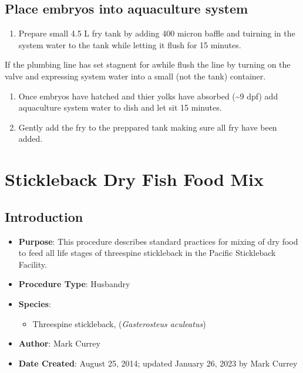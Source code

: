 \documentclass[
  letterpaper,
  DIV=11,
  numbers=noendperiod]{scrreprt}
\providecommand{\tightlist}{%
  \setlength{\itemsep}{0pt}\setlength{\parskip}{0pt}}\usepackage{longtable,booktabs,array}
\begin{document}
\hypertarget{place-embryos-into-aquaculture-system}{%
\section{Place embryos into aquaculture
system}\label{place-embryos-into-aquaculture-system}}

\begin{enumerate}
\def\labelenumi{\arabic{enumi}.}
\setcounter{enumi}{28}
\tightlist
\item
  Prepare small 4.5 L fry tank by adding 400 micron baffle and tuirning
  in the system water to the tank while letting it flush for 15 minutes.
\end{enumerate}

If the plumbing line has set stagnent for awhile flush the line by
turning on the valve and expressing system water into a small (not the
tank) container.

\begin{enumerate}
\def\labelenumi{\arabic{enumi}.}
\setcounter{enumi}{29}
\tightlist
\item
  Once embryos have hatched and thier yolks have absorbed
  (\textasciitilde9 dpf) add aquaculture system water to dish and let
  sit 15 minutes.
\item
  Gently add the fry to the preppared tank making sure all fry have been
  added.
\end{enumerate}

\hypertarget{sec-husbandry-dry_fish_food}{%
\chapter{Stickleback Dry Fish Food
Mix}\label{sec-husbandry-dry_fish_food}}

\hypertarget{introduction-51}{%
\section{Introduction}\label{introduction-51}}

\begin{itemize}
\tightlist
\item
  \textbf{Purpose}: This procedure describes standard practices for
  mixing of dry food to feed all life stages of threespine stickleback
  in the Pacific Stickleback Facility.
\item
  \textbf{Procedure Type}: Husbandry
\item
  \textbf{Species}:

  \begin{itemize}
  \tightlist
  \item
    Threespine stickleback, (\emph{Gasterosteus aculeatus})
  \end{itemize}
\item
  \textbf{Author}: Mark Currey
\item
  \textbf{Date Created}: August 25, 2014; updated January 26, 2023 by
  Mark Currey
\end{itemize}
\end{document}
